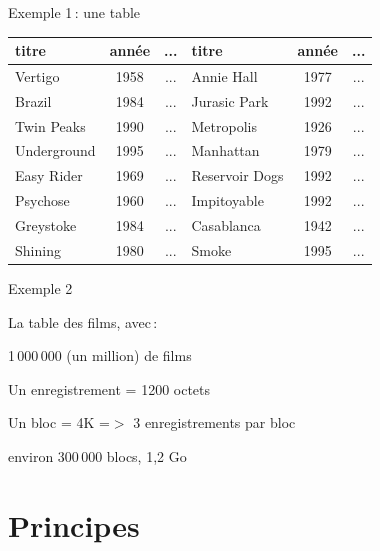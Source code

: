 \begin{frame}{Exemple 1\,: une table}

\begin{center}
\begin{small}
\begin{tabular}{l|c|c||l|c|c}
titre & année  & ...  & titre & année  & ...  \\
\hline
Vertigo  & 1958 & ... & Annie Hall & 1977 & ... \\
Brazil & 1984 & ... & Jurasic Park & 1992 & ... \\
Twin Peaks & 1990 & ...&  Metropolis & 1926 & ... \\
Underground & 1995 & ... & Manhattan & 1979 & ... \\
Easy Rider & 1969 & ... & Reservoir Dogs & 1992 & ... \\
Psychose & 1960 & ... & Impitoyable & 1992 & ... \\
Greystoke & 1984 & ... & Casablanca & 1942 & ... \\
Shining & 1980 & ... & Smoke & 1995 & ... \\
\hline
\end{tabular}
\end{small}
\end{center}

\end{frame}
\begin{frame}{Exemple 2}

La table des films,  avec\,:
\begin{redbullet}
  \item 1\,000\,000 (un million) de films
  \item Un enregistrement = 1200 octets
  \item Un bloc = 4K =$>$ 3 enregistrements par bloc 
  \item environ 300\,000 blocs, 1,2 Go
\end{redbullet}

\end{frame}
\section{Principes}


